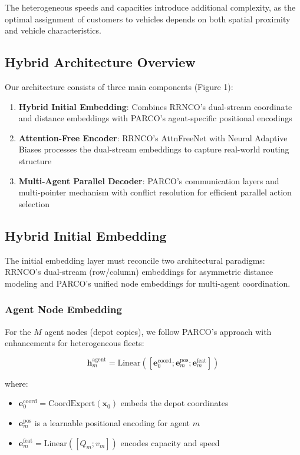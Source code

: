 \documentclass[lettersize,journal]{IEEEtran}
\begin{document}
The heterogeneous speeds and capacities introduce additional complexity, as the optimal assignment of customers to vehicles depends on both spatial proximity and vehicle characteristics.

\subsection{Hybrid Architecture Overview}

Our architecture consists of three main components (Figure 1):

\begin{enumerate}
\item \textbf{Hybrid Initial Embedding}: Combines RRNCO's dual-stream coordinate and distance embeddings with PARCO's agent-specific positional encodings
\item \textbf{Attention-Free Encoder}: RRNCO's AttnFreeNet with Neural Adaptive Biases processes the dual-stream embeddings to capture real-world routing structure
\item \textbf{Multi-Agent Parallel Decoder}: PARCO's communication layers and multi-pointer mechanism with conflict resolution for efficient parallel action selection
\end{enumerate}

\subsection{Hybrid Initial Embedding}

The initial embedding layer must reconcile two architectural paradigms: RRNCO's dual-stream (row/column) embeddings for asymmetric distance modeling and PARCO's unified node embeddings for multi-agent coordination.

\subsubsection{Agent Node Embedding}

For the $M$ agent nodes (depot copies), we follow PARCO's approach with enhancements for heterogeneous fleets:

\begin{equation}
\mathbf{h}^{\text{agent}}_m = \text{Linear}([\mathbf{e}^{\text{coord}}_0; \mathbf{e}^{\text{pos}}_m; \mathbf{e}^{\text{feat}}_m])
\end{equation}

where:
\begin{itemize}
\item $\mathbf{e}^{\text{coord}}_0 = \text{CoordExpert}(\mathbf{x}_0)$ embeds the depot coordinates
\item $\mathbf{e}^{\text{pos}}_m$ is a learnable positional encoding for agent $m$
\item $\mathbf{e}^{\text{feat}}_m = \text{Linear}([Q_m; v_m])$ encodes capacity and speed
\end{itemize}
\end{document}
